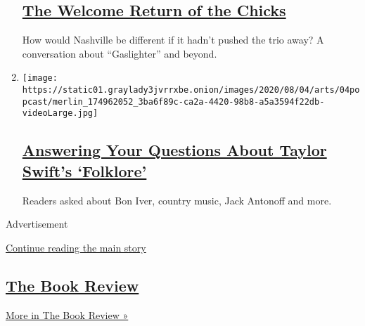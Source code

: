 \begin{enumerate}
  \hypertarget{the-welcome-return-of-the-chicks}{%
  \subsection{\texorpdfstring{\href{/2020/08/10/arts/music/popcast-the-chicks-gaslighter.html}{The
  Welcome Return of the
  Chicks}}{The Welcome Return of the Chicks}}\label{the-welcome-return-of-the-chicks}}

  How would Nashville be different if it hadn't pushed the trio away? A
  conversation about ``Gaslighter'' and beyond.
\item
  \texttt{[image: https://static01.graylady3jvrrxbe.onion/images/2020/08/04/arts/04popcast/merlin\_174962052\_3ba6f89c-ca2a-4420-98b8-a5a3594f22db-videoLarge.jpg]}

  \hypertarget{answering-your-questions-about-taylor-swifts-folklore}{%
  \subsection{\texorpdfstring{\href{/2020/08/04/arts/music/taylor-swift-folklore-questions.html}{Answering
  Your Questions About Taylor Swift's
  `Folklore'}}{Answering Your Questions About Taylor Swift's `Folklore'}}\label{answering-your-questions-about-taylor-swifts-folklore}}

  Readers asked about Bon Iver, country music, Jack Antonoff and more.
\end{enumerate}

Advertisement

\protect\hyperlink{after-mid3}{Continue reading the main story}

\hypertarget{the-book-review}{%
\subsection{\texorpdfstring{\href{/column/book-review-podcast}{The Book
Review}}{The Book Review}}\label{the-book-review}}

\href{/column/book-review-podcast}{More in The Book Review »}

